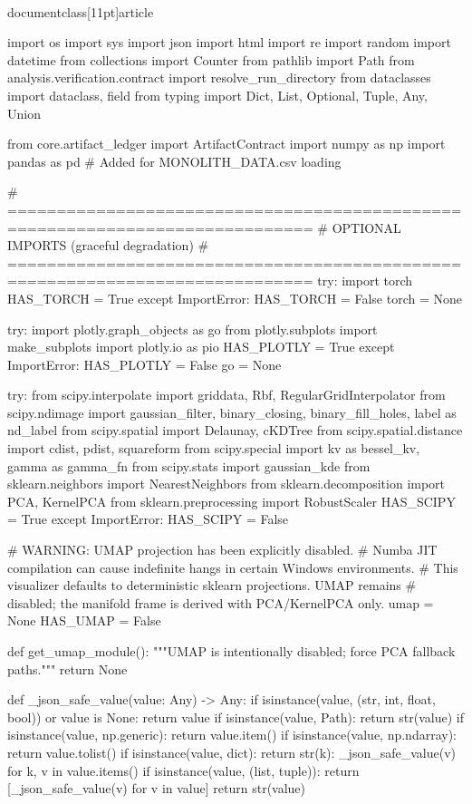 \\documentclass[11pt]{article}
\begin{document}
\begin{CodeBlock}
import os
import sys
import json
import html
import re
import random
import datetime
from collections import Counter
from pathlib import Path
from analysis.verification.contract import resolve_run_directory
from dataclasses import dataclass, field
from typing import Dict, List, Optional, Tuple, Any, Union

from core.artifact_ledger import ArtifactContract
import numpy as np
import pandas as pd # Added for MONOLITH_DATA.csv loading

# =============================================================================
# OPTIONAL IMPORTS (graceful degradation)
# =============================================================================
try:
    import torch
    HAS_TORCH = True
except ImportError:
    HAS_TORCH = False
    torch = None

try:
    import plotly.graph_objects as go
    from plotly.subplots import make_subplots
    import plotly.io as pio
    HAS_PLOTLY = True
except ImportError:
    HAS_PLOTLY = False
    go = None

try:
    from scipy.interpolate import griddata, Rbf, RegularGridInterpolator
    from scipy.ndimage import gaussian_filter, binary_closing, binary_fill_holes, label as nd_label
    from scipy.spatial import Delaunay, cKDTree
    from scipy.spatial.distance import cdist, pdist, squareform
    from scipy.special import kv as bessel_kv, gamma as gamma_fn
    from scipy.stats import gaussian_kde
    from sklearn.neighbors import NearestNeighbors
    from sklearn.decomposition import PCA, KernelPCA
    from sklearn.preprocessing import RobustScaler
    HAS_SCIPY = True
except ImportError:
    HAS_SCIPY = False

# WARNING: UMAP projection has been explicitly disabled.
# Numba JIT compilation can cause indefinite hangs in certain Windows environments.
# This visualizer defaults to deterministic sklearn projections. UMAP remains
# disabled; the manifold frame is derived with PCA/KernelPCA only.
umap = None
HAS_UMAP = False


def get_umap_module():
    """UMAP is intentionally disabled; force PCA fallback paths."""
    return None


def _json_safe_value(value: Any) -> Any:
    if isinstance(value, (str, int, float, bool)) or value is None:
        return value
    if isinstance(value, Path):
        return str(value)
    if isinstance(value, np.generic):
        return value.item()
    if isinstance(value, np.ndarray):
        return value.tolist()
    if isinstance(value, dict):
        return {str(k): _json_safe_value(v) for k, v in value.items()}
    if isinstance(value, (list, tuple)):
        return [_json_safe_value(v) for v in value]
    return str(value)



\end{CodeBlock}
\end{document}
